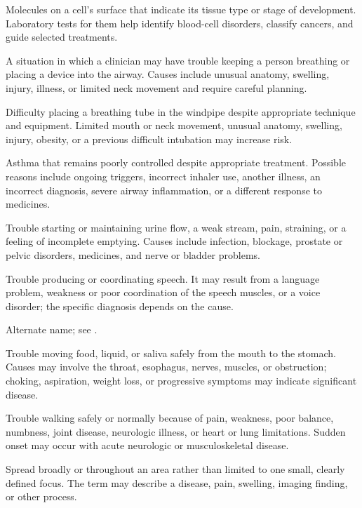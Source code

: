  Molecules on a cell’s surface that indicate its tissue type or stage of development. Laboratory tests for them help identify blood-cell disorders, classify cancers, and guide selected treatments.

 A situation in which a clinician may have trouble keeping a person breathing or placing a device into the airway. Causes include unusual anatomy, swelling, injury, illness, or limited neck movement and require careful planning.

 Difficulty placing a breathing tube in the windpipe despite appropriate technique and equipment. Limited mouth or neck movement, unusual anatomy, swelling, injury, obesity, or a previous difficult intubation may increase risk.

 Asthma that remains poorly controlled despite appropriate treatment. Possible reasons include ongoing triggers, incorrect inhaler use, another illness, an incorrect diagnosis, severe airway inflammation, or a different response to medicines.

 Trouble starting or maintaining urine flow, a weak stream, pain, straining, or a feeling of incomplete emptying. Causes include infection, blockage, prostate or pelvic disorders, medicines, and nerve or bladder problems.

 Trouble producing or coordinating speech. It may result from a language problem, weakness or poor coordination of the speech muscles, or a voice disorder; the specific diagnosis depends on the cause.

 Alternate name; see .

 Trouble moving food, liquid, or saliva safely from the mouth to the stomach. Causes may involve the throat, esophagus, nerves, muscles, or obstruction; choking, aspiration, weight loss, or progressive symptoms may indicate significant disease.

 Trouble walking safely or normally because of pain, weakness, poor balance, numbness, joint disease, neurologic illness, or heart or lung limitations. Sudden onset may occur with acute neurologic or musculoskeletal disease.

 Spread broadly or throughout an area rather than limited to one small, clearly defined focus. The term may describe a disease, pain, swelling, imaging finding, or other process.

